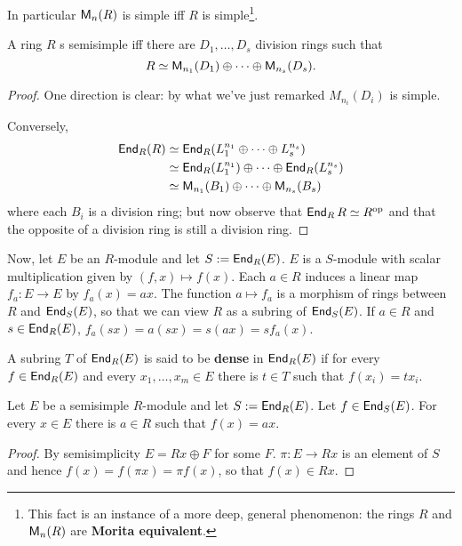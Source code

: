 In particular $\operatorname{\sf{M}}_n(R)$ is simple iff $R$ is simple\footnote{This fact is an instance of a more deep, general phenomenon: the rings $R$ and $\operatorname{\sf{M}}_n(R)$ are \textbf{Morita equivalent}.}.

\begin{thm} A ring $R$ s semisimple iff there are $D_1, \ldots, D_s$ division rings such that 
$$R \simeq \operatorname{\sf{M}}_{n_1}(D_1) \oplus \cdots \oplus \operatorname{\sf{M}}_{n_s}(D_s)\text{.}$$

\begin{proof}
One direction is clear: by what we've just remarked $M_{n_i}(D_i)$ is simple.

Conversely, 
\begin{align*}
    \operatorname{\sf{End}}_R (R) & \simeq \operatorname{\sf{End}}_R (L_1 ^{n_1} \oplus \cdots \oplus L_s ^{n_s}) \\
    & \simeq \operatorname{\sf{End}}_R (L_1 ^{n_1} ) \oplus \cdots \oplus \operatorname{\sf{End}}_R (L_s ^{n_s} ) \\
    & \simeq \operatorname{\sf{M}}_{n_1}(B_1) \oplus \cdots \oplus \operatorname{\sf{M}}_{n_s}(B_s)
\end{align*}
where each $B_i$ is a division ring; but now observe that $\operatorname{\sf{End}}_R R \simeq R^{\operatorname{op}}$ and that the opposite of a division ring is still a division ring.
\end{proof}
\end{thm}

Now, let $E$ be an $R$-module and let $S:=\operatorname{\sf{End}}_R(E)$. 
$E$ is a $S$-module with scalar multiplication given by $(f,x) \mapsto f(x)$. 
Each $a \in R$ induces a linear map $f_a : E \to E$ by $f_a(x)=ax$. 
The function $a \mapsto f_a$ is a morphism of rings between $R$ and $\operatorname{\sf{End}}_S(E)$, so that we can view $R$ as a subring of $\operatorname{\sf{End}}_S(E)$. 
If $a \in R$ and $s \in \operatorname{\sf{End}}_R(E)$, $f_a(sx)=a(sx)=s(ax)=sf_a(x)$. 

\begin{defn}
A subring $T$ of $\operatorname{\sf{End}}_R(E)$ is said to be \textbf{dense} in $\operatorname{\sf{End}}_R(E)$ if for every $f \in \operatorname{\sf{End}}_R(E)$ and every $x_1, \ldots, x_m\in E$ there is $t \in T$ such that $f(x_i)=tx_i$. 
\end{defn}

\begin{lem}
Let $E$ be a semisimple $R$-module and let $S:=\operatorname{\sf{End}}_R(E)$. 
Let $f \in \operatorname{\sf{End}}_S(E)$. For every $x \in E$ there is $a \in R$ such that $f(x)=ax$. 
\begin{proof}
By semisimplicity $E=Rx \oplus F$ for some $F$. 
$\pi: E \to Rx$ is an element of $S$ and hence $f(x)=f(\pi x)=\pi f(x)$, so that $f(x) \in Rx$. 
\end{proof}
\end{lem}


